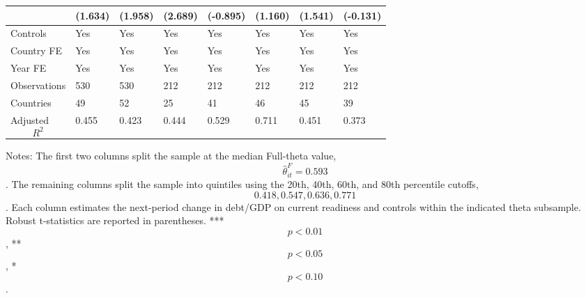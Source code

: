 \begin{table}[H]
\begin{threeparttable}
\begin{tabularx}{\textwidth}{lYYYYYYY}
  & (1.634) & (1.958) & (2.689) & (-0.895) & (1.160) & (1.541) & (-0.131) \\
\midrule
Controls & Yes & Yes & Yes & Yes & Yes & Yes & Yes \\
Country FE & Yes & Yes & Yes & Yes & Yes & Yes & Yes \\
Year FE & Yes & Yes & Yes & Yes & Yes & Yes & Yes \\
Observations & 530 & 530 & 212 & 212 & 212 & 212 & 212 \\
Countries & 49 & 52 & 25 & 41 & 46 & 45 & 39 \\
Adjusted $$R^2$$ & 0.455 & 0.423 & 0.444 & 0.529 & 0.711 & 0.451 & 0.373 \\
\bottomrule
\end{tabularx}
\begin{tablenotes}[flushleft]\footnotesize
\item Notes: The first two columns split the sample at the median Full-theta value, $$\widehat{\theta}^{F}_{it}=0.593$$. The remaining columns split the sample into quintiles using the 20th, 40th, 60th, and 80th percentile cutoffs, $$0.418, 0.547, 0.636, 0.771$$. Each column estimates the next-period change in debt/GDP on current readiness and controls within the indicated theta subsample. Robust t-statistics are reported in parentheses. *** $$p<0.01$$, ** $$p<0.05$$, * $$p<0.10$$.
\end{tablenotes}
\end{threeparttable}
\end{table}
